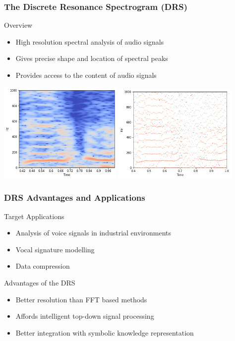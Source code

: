 \begin{frame}
\frametitle{The Discrete Resonance Spectrogram (DRS)}
	\begin{block}{Overview}
		\begin{itemize}
			\item High resolution spectral analysis of audio signals
			\item Gives precise shape and location of spectral peaks 
			\item Provides access to the content of audio signals
		\end{itemize}
	\end{block}
	\centering
	\includegraphics[width=0.45\textwidth]{images/voice-ffts.png}	
	\includegraphics[width=0.45\textwidth]{images/voice-drs.png}	
\end{frame}

\begin{frame}
\frametitle{DRS Advantages and Applications}
	\begin{block}{Target Applications}
		\begin{itemize}
			\item Analysis of voice signals in industrial environments
			\item Vocal signature modelling
			\item Data compression
		\end{itemize}	
	\end{block}
	\begin{block}{Advantages of the DRS}
		\begin{itemize}
			\item Better resolution than FFT based methods
			\item Affords intelligent top-down signal processing
			\item Better integration with symbolic knowledge representation
		\end{itemize}
	\end{block}
\end{frame}

